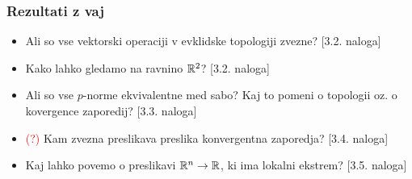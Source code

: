 \subsubsection*{Rezultati z vaj}
\begin{itemize}
    \item Ali so vse vektorski operaciji v evklidske topologiji zvezne? [3.2. naloga]
    \item Kako lahko gledamo na ravnino $\mathbb{R}^2$? [3.2. naloga]
    \item Ali so vse $p$-norme ekvivalentne med sabo? Kaj to pomeni o topologii oz. o kovergence zaporedij? [3.3. naloga]
    \item \textcolor{red}{(?)} Kam zvezna preslikava preslika konvergentna zaporedja? [3.4. naloga]
    \item Kaj lahko povemo o preslikavi $\mathbb{R}^n \to \mathbb{R}$, ki ima lokalni ekstrem? [3.5. naloga]
\end{itemize}

